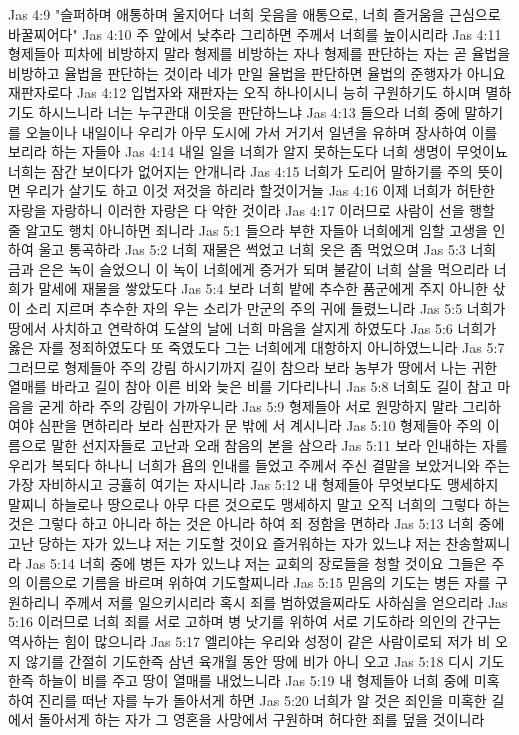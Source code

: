 Jas 4:9  "슬퍼하며 애통하며 울지어다 너희 웃음을 애통으로, 너희 즐거움을 근심으로 바꿀찌어다"
Jas 4:10  주 앞에서 낮추라 그리하면 주께서 너희를 높이시리라
Jas 4:11  형제들아 피차에 비방하지 말라 형제를 비방하는 자나 형제를 판단하는 자는 곧 율법을 비방하고 율법을 판단하는 것이라 네가 만일 율법을 판단하면 율법의 준행자가 아니요 재판자로다
Jas 4:12  입법자와 재판자는 오직 하나이시니 능히 구원하기도 하시며 멸하기도 하시느니라 너는 누구관대 이웃을 판단하느냐
Jas 4:13  들으라 너희 중에 말하기를 오늘이나 내일이나 우리가 아무 도시에 가서 거기서 일년을 유하며 장사하여 이를 보리라 하는 자들아
Jas 4:14  내일 일을 너희가 알지 못하는도다 너희 생명이 무엇이뇨 너희는 잠간 보이다가 없어지는 안개니라
Jas 4:15  너희가 도리어 말하기를 주의 뜻이면 우리가 살기도 하고 이것 저것을 하리라 할것이거늘
Jas 4:16  이제 너희가 허탄한 자랑을 자랑하니 이러한 자랑은 다 악한 것이라
Jas 4:17  이러므로 사람이 선을 행할 줄 알고도 행치 아니하면 죄니라
Jas 5:1  들으라 부한 자들아 너희에게 임할 고생을 인하여 울고 통곡하라
Jas 5:2  너희 재물은 썩었고 너희 옷은 좀 먹었으며
Jas 5:3  너희 금과 은은 녹이 슬었으니 이 녹이 너희에게 증거가 되며 불같이 너희 살을 먹으리라 너희가 말세에 재물을 쌓았도다
Jas 5:4  보라 너희 밭에 추수한 품군에게 주지 아니한 삯이 소리 지르며 추수한 자의 우는 소리가 만군의 주의 귀에 들렸느니라
Jas 5:5  너희가 땅에서 사치하고 연락하여 도살의 날에 너희 마음을 살지게 하였도다
Jas 5:6  너희가 옳은 자를 정죄하였도다 또 죽였도다 그는 너희에게 대항하지 아니하였느니라
Jas 5:7  그러므로 형제들아 주의 강림 하시기까지 길이 참으라 보라 농부가 땅에서 나는 귀한 열매를 바라고 길이 참아 이른 비와 늦은 비를 기다리나니
Jas 5:8  너희도 길이 참고 마음을 굳게 하라 주의 강림이 가까우니라
Jas 5:9  형제들아 서로 원망하지 말라 그리하여야 심판을 면하리라 보라 심판자가 문 밖에 서 계시니라
Jas 5:10  형제들아 주의 이름으로 말한 선지자들로 고난과 오래 참음의 본을 삼으라
Jas 5:11  보라 인내하는 자를 우리가 복되다 하나니 너희가 욥의 인내를 들었고 주께서 주신 결말을 보았거니와 주는 가장 자비하시고 긍휼히 여기는 자시니라
Jas 5:12  내 형제들아 무엇보다도 맹세하지 말찌니 하늘로나 땅으로나 아무 다른 것으로도 맹세하지 말고 오직 너희의 그렇다 하는것은 그렇다 하고 아니라 하는 것은 아니라 하여 죄 정함을 면하라
Jas 5:13  너희 중에 고난 당하는 자가 있느냐 저는 기도할 것이요 즐거워하는 자가 있느냐 저는 찬송할찌니라
Jas 5:14  너희 중에 병든 자가 있느냐 저는 교회의 장로들을 청할 것이요 그들은 주의 이름으로 기름을 바르며 위하여 기도할찌니라
Jas 5:15  믿음의 기도는 병든 자를 구원하리니 주께서 저를 일으키시리라 혹시 죄를 범하였을찌라도 사하심을 얻으리라
Jas 5:16  이러므로 너희 죄를 서로 고하며 병 낫기를 위하여 서로 기도하라 의인의 간구는 역사하는 힘이 많으니라
Jas 5:17  엘리야는 우리와 성정이 같은 사람이로되 저가 비 오지 않기를 간절히 기도한즉 삼년 육개월 동안 땅에 비가 아니 오고
Jas 5:18  디시 기도한즉 하늘이 비를 주고 땅이 열매를 내었느니라
Jas 5:19  내 형제들아 너희 중에 미혹하여 진리를 떠난 자를 누가 돌아서게 하면
Jas 5:20  너희가 알 것은 죄인을 미혹한 길에서 돌아서게 하는 자가 그 영혼을 사망에서 구원하며 허다한 죄를 덮을 것이니라



